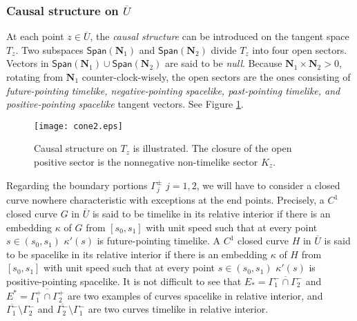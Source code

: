 \documentclass[11pt]{amsart}
\theoremstyle{plain}
\theoremstyle{remark}
\numberwithin{equation}{section}
\numberwithin{Thm}{section}
\def\U{\overline{U}}
\def\N{{\mathbf N}}
\begin{document}
\subsubsection{Causal structure on $\U$}

 At each point $z\in \U$, the {\it causal structure} can be introduced on the tangent space $T_z$. Two subspaces $\textsf{Span}(\N_1)$ and $\textsf{Span}(\N_2)$ divide $T_z$ into four open sectors. Vectors in $\textsf{Span}(\N_1) \cup \textsf{Span}(\N_2)$ are said to be {\it null}. Because $\N_1 \times \N_2 >0$, rotating from $\N_1$ counter-clock-wisely, the open sectors are the ones consisting of {\it future-pointing timelike, negative-pointing spacelike, past-pointing timelike, and positive-pointing spacelike} tangent vectors. See Figure \ref{Tz}.
 
\begin{figure}[ht]
 \centering
 \centering
 \psfrag{N1}{$\N_1$}
 \psfrag{N2}{$\N_2$}
 \texttt{[image: cone2.eps]} 
  \caption{Causal structure on $T_z$ is illustrated. The closure of the open positive sector is the nonnegative non-timelike sector $K_z$.} \label{Tz}
\end{figure}

 
 Regarding the boundary portions $\Gamma^\pm_j$ $j=1,2$, we will have to consider a closed curve nowhere characteristic with exceptions at the end points. Precisely, a $C^1$ closed curve $G$ in $\U$ is said to be timelike in its relative interior if there is an embedding $\kappa$ of $G$ from $[s_0,s_1]$ with unit speed such that at every point $s\in(s_0,s_1)$ $\kappa'(s)$ is future-pointing timelike. A $C^1$ closed curve $H$ in $\U$ is said to be spacelike in its relative interior if there is an embedding $\kappa$ of $H$ from $[s_0,s_1]$ with unit speed such that at every point $s\in(s_0,s_1)$ $\kappa'(s)$ is positive-pointing spacelike. It is not difficult to see that $E_*=\overline{\Gamma_1^-\cap \Gamma_2^-}$ and $E^*=\overline{\Gamma_1^+\cap \Gamma_2^+}$ are two examples of curves spacelike in relative interior, and $\overline{\Gamma_1^-} \setminus \Gamma_2^-$ and $\overline{\Gamma_2^-} \setminus \Gamma_1^-$ are two curves timelike in relative interior.
 
\end{document}

